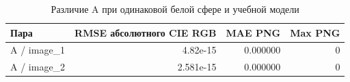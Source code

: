 \begin{table}[H]\centering\small
\caption{Различие A при одинаковой белой сфере и учебной модели}
\begin{tabular}{@{}lrrr@{}}\toprule Пара & RMSE абсолютного CIE RGB & MAE PNG & Max PNG\\\midrule
A / image\_1 & 4.82e-15 & 0.000000 & 0 \\
A / image\_2 & 2.581e-15 & 0.000000 & 0 \\
\bottomrule\end{tabular}\end{table}